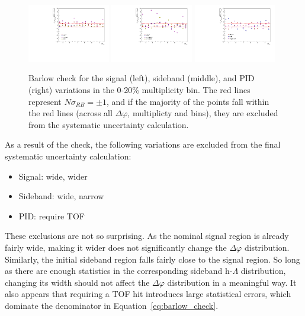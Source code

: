 \begin{figure}[ht]
    \centering
    \includegraphics[width=0.32\textwidth]{figures/analysis/signal_barlow_0_20.pdf}
    \includegraphics[width=0.32\textwidth]{figures/analysis/sideband_barlow_0_20.pdf}
    \includegraphics[width=0.32\textwidth]{figures/analysis/pid_barlow_0_20.pdf}
    \caption{Barlow check for the signal (left), sideband (middle), and PID (right) variations in the 0-20\% multiplicity bin. The red lines represent $N\sigma_{RB} = \pm 1$, and if the majority of the points fall within the red lines (across all $\Delta\varphi$, multiplicty and \pt bins), they are excluded from the systematic uncertainty calculation.}
    \label{fig:barlow_check_0_20}
\end{figure}

As a result of the check, the following variations are excluded from the final systematic uncertainty calculation:
%
\begin{itemize}
    \item Signal: wide, wider
    \item Sideband: wide, narrow
    \item PID: require TOF
\end{itemize}
%
These exclusions are not so surprising. As the nominal signal region is already fairly wide, making it wider does not significantly change the $\Delta\varphi$ distribution. Similarly, the initial sideband region falls fairly close to the signal region. So long as there are enough statistics in the corresponding sideband h-$\Lambda$ distribution, changing its width should not affect the $\Delta\varphi$ distribution in a meaningful way. It also appears that requiring a TOF hit introduces large statistical errors, which dominate the denominator in Equation~\ref{eq:barlow_check}.

